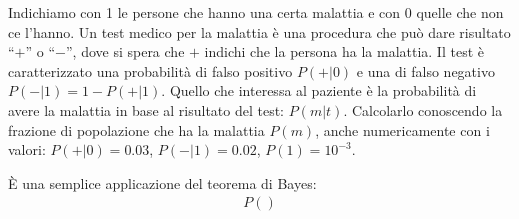 
\begin{exercise}
	Indichiamo con 1 le persone che hanno una certa malattia e con 0 quelle che non ce l'hanno.
	Un test medico per la malattia è una procedura che può dare risultato ``$+$'' o ``$-$'',
	dove si spera che $+$ indichi che la persona ha la malattia.
	Il test è caratterizzato una probabilità di falso positivo $P(+|0)$ e una di falso negativo
	$P(-|1) = 1 - P(+|1)$.
	Quello che interessa al paziente è la probabilità di avere la malattia in base al risultato del test:
	$P(m|t)$. Calcolarlo conoscendo la frazione di popolazione che ha la malattia $P(m)$, anche numericamente con i valori: $P(+|0)=0.03$, $P(-|1)=0.02$, $P(1)=10^{-3}$.
\end{exercise}

\begin{solution*}
	È una semplice applicazione del teorema di Bayes:
	\begin{align*}
		P()
	\end{align*}
\end{solution*}
